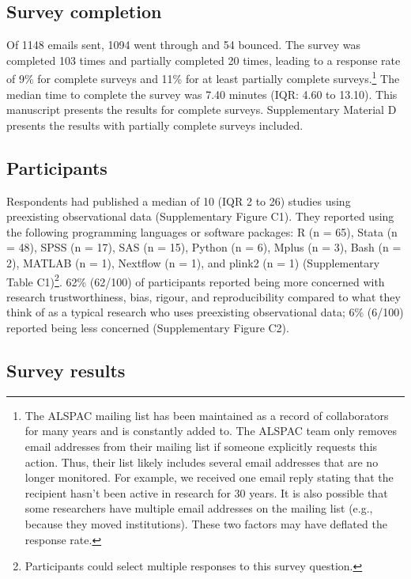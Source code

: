 \documentclass[
  man,floatsintext]{apa6}
\begin{document}
\hypertarget{survey-completion}{%
\subsection{Survey completion}\label{survey-completion}}

Of 1148 emails sent, 1094 went through and 54 bounced. The survey was completed 103 times and partially completed 20 times, leading to a response rate of 9\% for complete surveys and 11\% for at least partially complete surveys.\footnote[1]{The ALSPAC mailing list has been maintained as a record of collaborators for many years and is constantly added to. The ALSPAC team only removes email addresses from their mailing list if someone explicitly requests this action. Thus, their list likely includes several email addresses that are no longer monitored. For example, we received one email reply stating that the recipient hasn’t been active in research for 30 years. It is also possible that some researchers have multiple email addresses on the mailing list (e.g., because they moved institutions). These two factors may have deflated the response rate.} The median time to complete the survey was 7.40 minutes (IQR: 4.60 to 13.10). This manuscript presents the results for complete surveys. Supplementary Material D presents the results with partially complete surveys included.

\hypertarget{participants-1}{%
\subsection{Participants}\label{participants-1}}

Respondents had published a median of 10 (IQR 2 to 26) studies using preexisting observational data (Supplementary Figure C1). They reported using the following programming languages or software packages: R (n = 65), Stata (n = 48), SPSS (n = 17), SAS (n = 15), Python (n = 6), Mplus (n = 3), Bash (n = 2), MATLAB (n = 1), Nextflow (n = 1), and plink2 (n = 1) (Supplementary Table C1)\footnote[2]{Participants could select multiple responses to this survey question.}. 62\% (62/100) of participants reported being more concerned with research trustworthiness, bias, rigour, and reproducibility compared to what they think of as a typical research who uses preexisting observational data; 6\% (6/100) reported being less concerned (Supplementary Figure C2).

\hypertarget{survey-results}{%
\subsection{Survey results}\label{survey-results}}
\end{document}
